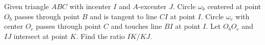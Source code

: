 Given triangle $ABC$ with incenter $I$ and $A$-excenter $J$. Circle $\omega_b$ centered at point $O_b$ passes through point $B$ and is tangent to line $CI$ at point $I$. Circle $\omega_c$ with center $O_c$ passes through point $C$ and touches line $BI$ at point $I$. Let $O_bO_c$ and $IJ$ intersect at point $K$. Find the ratio $IK/KJ$.